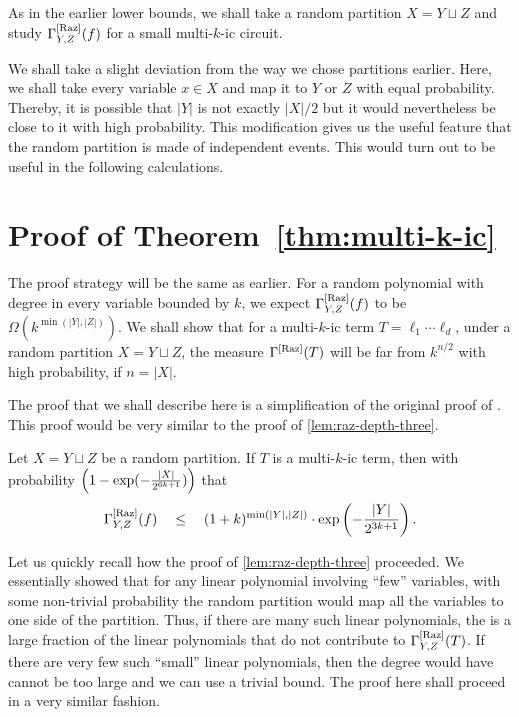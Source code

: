 As in the earlier lower bounds, we shall take a random partition $X = Y \sqcup Z$ and study $\Gamma^{\mathrm{[Raz]}}_{Y,Z}(f)$ for a small multi-$k$-ic circuit.

\begin{remark*}\rm
We shall take a slight deviation from the way we chose partitions earlier.
Here, we shall take every variable $x\in X$ and map it to $Y$ or $Z$ with equal probability.
Thereby, it is possible that $|Y|$ is not exactly $|X|/2$ but it would nevertheless be close to it with high probability.
This modification gives us the useful feature that the random partition is made of independent events.
This would turn out to be useful in the following calculations.
\end{remark*}

\section{Proof of Theorem~\ref{thm:multi-k-ic}}

The proof strategy will be the same as earlier.
For a random polynomial with degree in every variable bounded by $k$, we expect $\Gamma^{\mathrm{[Raz]}}_{Y,Z}(f)$ to be $\Omega(k^{\min(|Y|,|Z|)})$.
We shall show that for a multi-$k$-ic term $T = \ell_1\cdots \ell_d$, under a random partition $X = Y \sqcup Z$, the measure $\Gamma^{\mathrm{[Raz]}}(T)$ will be far from $k^{n/2}$ with high probability, if $n = |X|$.

The proof that we shall describe here is a simplification of the original proof of \cite{ks15}.
This proof would be very similar to the proof of \autoref{lem:raz-depth-three}.

\begin{lemma}\label{lem:multi-k-ic-ub}
Let $X = Y \sqcup Z$ be a random partition.
If $T$ is a multi-$k$-ic term, then with probability $\left(1 - \exp(-\frac{|X|}{2^{6k+1}})\right)$ that
\[
\Gamma^{\mathrm{[Raz]}}_{Y,Z}(f) \quad \leq \quad (1+k)^{\min(|Y|,|Z|)}\cdot \exp\left(-\frac{|Y|}{2^{3k+1}}\right).
\]
\end{lemma}


Let us quickly recall how the proof of \autoref{lem:raz-depth-three} proceeded.
We essentially showed that for any linear polynomial involving ``few'' variables, with some non-trivial probability the random partition would map all the variables to one side of the partition.
Thus, if there are many such linear polynomials, the is a large fraction of the linear polynomials that do not contribute to $\Gamma^{\mathrm{[Raz]}}_{Y,Z}(T)$.
If there are very few such ``small'' linear polynomials, then the degree would have cannot be too large and we can use a trivial bound.
The proof here shall proceed in a very similar fashion.


